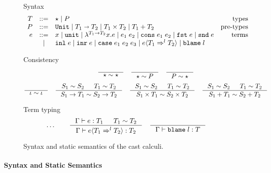 \documentclass[acmsmall,review,anonymous]{acmart}\settopmatter{printfolios=true,printccs=false,printacmref=false}
\newcommand{\stxrule}[3]{#1 & ::= & #3 & \text{#2}\\}
\newcommand{\stxrulecont}[1]{& | & #1 & \\}
\newcommand{\plus}[0]{+}
\newcommand{\judgetype}[3]{#1 \vdash #2 : #3}
\newcommand{\POOunit}[0]{\mathtt{Unit}}
\newcommand{\POOfun}[2]{#1 \shortrightarrow #2}
\newcommand{\POOprod}[2]{#1 \times #2}
\newcommand{\POOsum}[2]{#1 \plus #2}
\newcommand{\eOOvar}[1]{#1}
\newcommand{\eOOsole}[0]{\mathtt{unit}}
\newcommand{\eOOlam}[4]{\lambda^{#1\rightarrow{}#2}#3.#4}
\newcommand{\eOOapp}[2]{#1 \; #2}
\newcommand{\eOOcons}[2]{\mathtt{cons} \; #1 \; #2}
\newcommand{\eOOcar}[1]{\mathtt{fst} \; #1}
\newcommand{\eOOcdr}[1]{\mathtt{snd} \; #1}
\newcommand{\eOOinl}[1]{\mathtt{inl} \; #1}
\newcommand{\eOOinr}[1]{\mathtt{inr} \; #1}
\newcommand{\eOOcase}[3]{\mathtt{case} \; #1 \; #2 \; #3}
\newcommand{\eOOcast}[4]{#1 \langle \cOOcast{#2}{#3}{#4} \rangle}
\newcommand{\eOOblame}[1]{\mathtt{blame} \; #1}
\newcommand{\cOOcast}[3]{#1 \Rightarrow^{#2} #3}
\begin{document}
\begin{figure}
	Syntax
	\[
	\begin{array}{rclr}
	\stxrule{T}{types}{
		\star \mid{}
		P
	}
	\stxrule{P}{pre-types}{
		\POOunit \mid
		\POOfun{T_1}{T_2} \mid
		\POOprod{T_1}{T_2} \mid
		\POOsum{T_1}{T_2}
	}
	\stxrule{e}{terms}{
		\eOOvar{x} \mid{}
		\eOOsole{} \mid{}
		\eOOlam{T_1}{T_2}{x}{e} \mid
		\eOOapp{e_1}{e_2} \mid
		\eOOcons{e_1}{e_2} \mid
		\eOOcar{e} \mid
		\eOOcdr{e}
	}
	\stxrulecont{
		\eOOinl{e} \mid
		\eOOinr{e} \mid
		\eOOcase{e_1}{e_2}{e_3} \mid
		\eOOcast{e}{T_1}{l}{T_2} \mid
		\eOOblame{l}
	}
	\end{array}
	\]
	
	Consistency
	\begin{gather*}
	\inference{}{
		\star \sim \star
	} \quad
	\inference{}{
		\star \sim P
	} \quad
	\inference{}{
		P \sim \star
	} \\[1ex]
	\inference{}{
		\iota \sim \iota
	} \quad
	\inference{
		S_1 \sim S_2 &
		T_1 \sim T_2
	}{
		S_1 \rightarrow T_1 \sim S_2 \rightarrow T_2
	} \quad
	\inference{
		S_1 \sim S_2 &
		T_1 \sim T_2
	}{
		S_1 \times T_1 \sim S_2 \times T_2
	} \quad
	\inference{
		S_1 \sim S_2 &
		T_1 \sim T_2
	}{
		S_1 \plus T_1 \sim S_2 \plus T_2
	}
	\end{gather*}
	
	Term typing
	\fbox{$\judgetype{\Gamma}{e}{T}$}
	\begin{gather*}
          \dots \qquad
		\inference{
			\Gamma \vdash e : T_1 & T_1 \sim T_2
		}{
			\judgetype{\Gamma}{\eOOcast{e}{T_1}{l}{T_2}}{T_2}
		} \quad
		\inference{
		}{
			\judgetype{\Gamma}{\eOOblame{l}}{T}
		}
	\end{gather*}
	
	\caption{Syntax and static semantics of the cast calculi.}
	\label{fig:blame-static}
\end{figure}


\paragraph{Syntax and Static Semantics}
\end{document}
